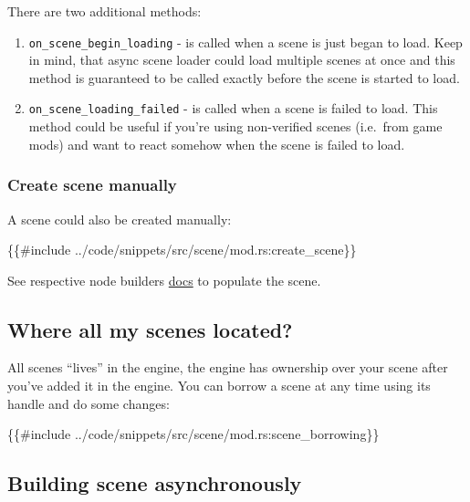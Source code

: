 \documentclass[
]{book}
\newenvironment{Shaded}{\begin{snugshade}}{\end{snugshade}}
\newcommand{\NormalTok}[1]{#1}
\providecommand{\tightlist}{%
  \setlength{\itemsep}{0pt}\setlength{\parskip}{0pt}}
\theoremstyle{definition}
\theoremstyle{definition}
\theoremstyle{definition}
\theoremstyle{definition}
\theoremstyle{remark}
\begin{document}
There are two additional methods:

\begin{enumerate}
\def\labelenumi{\arabic{enumi})}
\tightlist
\item
  \texttt{on\_scene\_begin\_loading} - is called when a scene is just began to load. Keep in mind, that async scene loader could load multiple scenes at once and this method is guaranteed to be called exactly before the scene is started to load.
\item
  \texttt{on\_scene\_loading\_failed} - is called when a scene is failed to load. This method could be useful if you're using non-verified scenes (i.e.~from game mods) and want to react somehow when the scene is failed to load.
\end{enumerate}

\subsubsection{Create scene manually}\label{create-scene-manually}

A scene could also be created manually:

\begin{Shaded}
\begin{Highlighting}[]
\NormalTok{\{\{\#include ../code/snippets/src/scene/mod.rs:create\_scene\}\}}
\end{Highlighting}
\end{Shaded}

See respective node builders \href{../scene/graph.md\#using-node-builders}{docs} to populate the scene.

\subsection{Where all my scenes located?}\label{where-all-my-scenes-located}

All scenes ``lives'' in the engine, the engine has ownership over your scene after you've added it in the engine. You can borrow a scene at any time using its handle and do some changes:

\begin{Shaded}
\begin{Highlighting}[]
\NormalTok{\{\{\#include ../code/snippets/src/scene/mod.rs:scene\_borrowing\}\}}
\end{Highlighting}
\end{Shaded}

\subsection{Building scene asynchronously}\label{building-scene-asynchronously}
\end{document}
